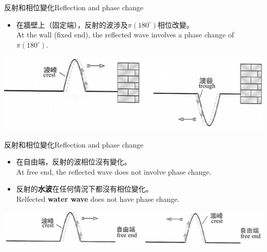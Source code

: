 \documentclass[beamer=true]{standalone}
\begin{document}
\begin{frame}{反射和相位變化Reflection and phase change}
    \begin{itemize}
        \item 在牆壁上（固定端），反射的波涉及$\pi(180^\circ)$相位改變。\\At the wall (fixed end), the reflected wave involves a phase change of $\pi(180^\circ)$.
    \end{itemize}\bigskip\bigskip
    \par{\par\centering\includegraphics[width=\textwidth]{./img/ch2_cf_2024-05-24-14-26-04.png}\par}
\end{frame}

\begin{frame}{反射和相位變化Reflection and phase change}
    \begin{itemize}
        \item 在自由端，反射的波相位沒有變化。\\At free end, the reflected wave does not involve phase change.
        \item 反射的\textbf{水波}在任何情況下都沒有相位變化。\\Relfected \textbf{water wave} does not have phase change.
    \end{itemize}\bigskip
    \par{\par\centering\includegraphics[width=\textwidth]{./img/ch2_cf_2024-05-24-14-31-18.png}\par}
\end{frame}
\end{document}
